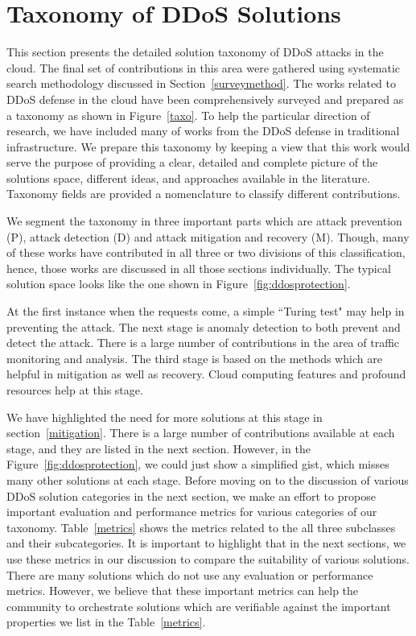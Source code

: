 \documentclass[final,5p,times,twocolumn]{elsarticle}
\begin{document}
\section{Taxonomy of DDoS Solutions}
\label{taxosection}
This section presents the detailed solution taxonomy of DDoS attacks in the cloud. The final set of contributions in this area were gathered using systematic search methodology discussed in Section~\ref{surveymethod}. The works related to DDoS defense in the cloud have been comprehensively surveyed and prepared as a taxonomy as shown in Figure~\ref{taxo}. To help the particular direction of research, we have included many of works from the DDoS defense in traditional infrastructure. We prepare this taxonomy by keeping a view that this work would serve the purpose of providing a clear, detailed and complete picture of the solutions space, different ideas, and approaches available in the literature. Taxonomy fields are provided a nomenclature to classify different contributions. \par We segment the taxonomy in three important parts which are attack prevention (P), attack detection (D) and attack mitigation and recovery (M). Though, many of these works have contributed in all three or two divisions of this classification, hence, those works are discussed in all those sections individually. The typical solution space looks like the one shown in Figure~\ref{fig:ddosprotection}. 

\noindent At the first instance when the requests come, a simple ``Turing test" may help in preventing the attack. The next stage is anomaly detection to both prevent and detect the attack. There is a large number of contributions in the area of traffic monitoring and analysis. The third stage is based on the methods which are helpful in mitigation as well as recovery. Cloud computing features and profound resources help at this stage. \par We have highlighted the need for more solutions at this stage in section~\ref{mitigation}. There is a large number of contributions available at each stage, and they are listed in the next section. However, in the Figure~\ref{fig:ddosprotection}, we could just show a simplified gist, which misses many other solutions at each stage.  
{Before moving on to the discussion of various DDoS solution categories in the next section, we make an effort to propose important evaluation and performance metrics for various categories of our taxonomy. Table~\ref{metrics} shows the metrics related to the all three subclasses and their subcategories. It is important to highlight that in the next sections, we use these metrics in our discussion to compare the suitability of various solutions. There are many solutions which do not use any evaluation or performance metrics. However, we believe that these important metrics can help the community to orchestrate solutions which are verifiable against the important properties we list in the Table~\ref{metrics}. }
\end{document}

